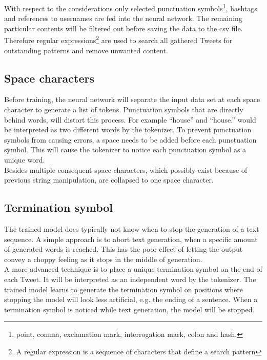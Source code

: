 \documentclass[hidelinks, conference]{IEEEtran}
\begin{document}
With respect to the considerations only selected punctuation symbols\footnote{point, comma, exclamation mark, interrogation mark, colon and hash.},  hashtags and references to usernames are fed into the neural network. The remaining particular contents will be filtered out before saving the data to the csv file. Therefore regular expressions\footnote{A regular expression is a sequence of characters that define a search pattern} are used to search all gathered Tweets for outstanding patterns and remove unwanted content.

\subsection{Space characters}\label{subsec_space_characters}

Before training, the neural network will separate the input data set at each space character to generate a list of tokens. Punctuation symbols that are directly behind words, will distort this process. For example ``house'' and ``house.'' would be interpreted as two different words by the tokenizer. To prevent punctuation symbols from causing errors, a space needs to be added before each punctuation symbol. This will cause the tokenizer to notice each punctuation symbol as a unique word.\\
Besides multiple consequent space characters, which possibly exist because of previous string manipulation, are collapsed to one space character.

\subsection{Termination symbol}\label{subsec_termination_symbol}

The trained model does typically not know when to stop the generation of a text sequence. A simple approach is to abort text generation, when a specific amount of generated words is reached. This has the poor effect of letting the output convey a choppy feeling as it stops in the middle of generation.\\
A more advanced technique is to place a unique termination symbol on the end of each Tweet. It will be interpreted as an independent word by the tokenizer. The trained model learns to generate the termination symbol on positions where stopping the model will look less artificial, e.g. the ending of a sentence. When a termination symbol is noticed while text generation, the model will be stopped.
\end{document}
